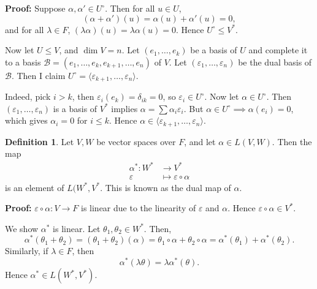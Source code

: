 \documentclass[12pt]{article}
\theoremstyle{definition}
\newtheorem{definition}{Definition}[section]
\theoremstyle{remark}
\begin{document}
\begin{adjustbox}{minipage = \columnwidth - 25.5pt, margin=1em, frame=1pt, margin=0em}
	\textbf{Proof:} Suppose $\alpha, \alpha' \in U^{\circ}$. Then for all $u \in U$,
	\[
		(\alpha + \alpha')(u) = \alpha(u) + \alpha'(u) = 0
	,\]
	and for all $\lambda \in F$, $(\lambda \alpha)(u) = \lambda \alpha(u) = 0$. Hence $U^{\circ} \le V^{\ast}$.

	Now let $U \leq V$, and $\dim V = n$. Let $(e_1, \ldots, e_k)$ be a basis of $U$ and complete it to a basis $\mathcal{B} = (e_1, \ldots, e_k, e_{k+1}, \ldots, e_n)$ of $V$. Let $(\varepsilon_1, \ldots, \varepsilon_n)$ be the dual basis of $\mathcal{B}$. Then I claim $U^{\circ} = \langle \varepsilon_{k+1}, \ldots, \varepsilon_n\rangle$.

	Indeed, pick $i > k$, then $\varepsilon_i(e_k) = \delta_{ik} = 0$, so $\varepsilon_i \in U^{\circ}$. Now let $\alpha \in U^{\circ}$. Then $(\varepsilon_1, \ldots, \varepsilon_n)$ is a basis of $V^{\ast}$ implies $\alpha = \sum \alpha_i \varepsilon_i$. But $\alpha \in U^{\circ} \implies \alpha(e_i) = 0$, which gives $\alpha_i = 0$ for $i \leq k$. Hence $\alpha \in \langle \varepsilon_{k+1}, \ldots, \varepsilon_n\rangle$.
\end{adjustbox}

\begin{definition}
	Let $V, W$ be vector spaces over $F$, and let $\alpha \in L(V, W)$. Then the map
	\begin{align*}
		\alpha^{\ast} : W^{\ast} &\to V^{\ast} \\
		\varepsilon &\mapsto \varepsilon \circ \alpha
	\end{align*}
	is an element of $L(W^{\ast}, V^{\ast}$. This is known as the dual map of $\alpha$.
\end{definition}

\begin{adjustbox}{minipage = \columnwidth - 25.5pt, margin=1em, frame=1pt, margin=0em}
\textbf{Proof:} $\varepsilon \circ \alpha : V \to F$ is linear due to the linearity of $\varepsilon$ and $\alpha$. Hence $\varepsilon \circ \alpha \in V^{\ast}$.

We show $\alpha^{\ast}$ is linear. Let $\theta_1, \theta_2 \in W^{\ast}$. Then,
\[
	\alpha^{\ast}(\theta_1 + \theta_2) = (\theta_1 + \theta_2)(\alpha) = \theta_1 \circ \alpha + \theta_2 \circ \alpha = \alpha^{\ast} (\theta_1) + \alpha^{\ast}(\theta_2)
.\]
Similarly, if $\lambda \in F$, then
\[
	\alpha^{\ast}(\lambda \theta) = \lambda \alpha^{\ast}(\theta)
.\]
Hence $\alpha^{\ast} \in L(W^{\ast}, V^{\ast})$.
\end{adjustbox}
\end{document}
